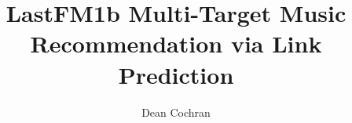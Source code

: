 \documentclass[a4paper,12pt,twoside]{report}
\begin{document}

\title{LastFM1b Multi-Target Music Recommendation via Link Prediction}
\author{Dean Cochran}

\maketitle
\maketitle
\restoregeometry

\cleardoublepage 










\listoffigures
\newpage
\listoftables



% 
% 

% 
\end{document}
